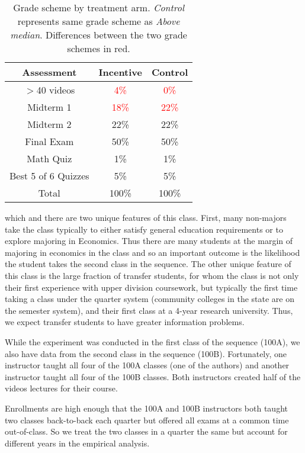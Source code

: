\documentclass[12pt]{article}
\newcommand{\red}[1]{\textcolor{red}{#1}}
\begin{document}
\begin{table}
	\caption{Grade scheme by treatment arm. \textit{Control} represents same grade scheme as \textit{Above median}. Differences between the two grade schemes in red.}
	\centering
	\begin{tabular}{ c|c|c }
		Assessment & Incentive & Control \\
		\hline
		$>$40 videos & \red{4\%} & \red{0\%} \\
		Midterm 1 & \red{18\%} & \red{22\%} \\
		Midterm 2 & 22\% & 22\% \\
		Final Exam & 50\% & 50\% \\
		Math Quiz & 1\% & 1\% \\
		Best 5 of 6 Quizzes & 5\% & 5\% \\
		\hline
		Total & 100\% & 100\% \\
	\end{tabular}
	\label{gradescheme}
\end{table}



which and there are two unique features of this class. First, many non-majors take the class typically to either satisfy general education requirements or to explore majoring in Economics. Thus there are many students at the margin of majoring in economics in the class and so an important outcome is the likelihood the student takes the second class in the sequence. The other unique feature of this class is the large fraction of transfer students, for whom the class is not only their first experience with upper division coursework, but typically the first time taking a class under the quarter system (community colleges in the state are on the semester system), and their first class at a 4-year research university. Thus, we expect transfer students to have greater information problems.

While the experiment was conducted in the first class of the sequence (100A), we also have data from the second class in the sequence (100B). Fortunately, one instructor taught all four of the 100A classes (one of the authors) and another instructor taught all four of the 100B classes. Both instructors created half of the videos lectures for their course.

Enrollments are high enough that the 100A and 100B instructors both taught two classes back-to-back each quarter but offered all exams at a common time out-of-class. So we treat the two classes in a quarter the same but account for different years in the empirical analysis.
\end{document}
